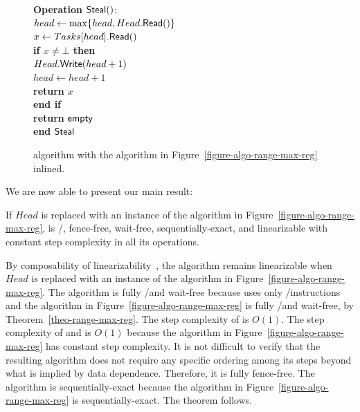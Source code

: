 \begin{figure}[H]
{{\begin{minipage}[t]{150mm}
\begin{tabbing}
          {\bf Operation} \({\sf \small Steal}()\): \\
           \> \> \(head \leftarrow \max\{head, Head.{\sf \small Read}()\}\)\\
           \> \> \(x \leftarrow Tasks[head].{\sf \small Read}()\) \\
           \> \> {\bf if \(x \neq \bot\) then}\\
           \> \> \> \(Head.{\sf \small Write}(head+1)\)\\
           \> \> \> \(head \leftarrow head+1\)\\
           \> \> \> {\bf return} \(x\)\\
           \> \> {\bf end if}\\
           \> \> {\bf return} ${\sf \small empty}$\\
          {\bf end} ${\sf \small Steal}$

        \end{tabbing}
      \end{minipage} }
    \caption{\label{figure-w-mult}\NCWSM algorithm with the \RangeMaxReg
      algorithm in Figure~\ref{figure-algo-range-max-reg} inlined.}
  }
\end{figure}

We are now able to present our main result:

\begin{theorem}\label{theo-wf-fully}
If \(Head\) is replaced with an instance of the algorithm in Figure~\ref{figure-algo-range-max-reg}, \NCWSM is \R/\W, fence-free, wait-free, sequentially-exact, and linearizable with constant step complexity in all its operations.
\end{theorem}

\begin{thesisproof}
By composability of linearizability~\cite{DBLP_journals_toplas_HerlihyW90}, the algorithm remains linearizable when \(Head\) is replaced with an instance of the algorithm in Figure~\ref{figure-algo-range-max-reg}. The algorithm is fully \R/\W and wait-free because \Put uses only \R/\W instructions and the \RangeMaxReg algorithm in Figure~\ref{figure-algo-range-max-reg} is fully \R/\W and wait-free, by Theorem~\ref{theo-range-max-reg}. The step complexity of \Put is $O(1)$. The step complexity of \Take and \Steal is $O(1)$ because the \RangeMaxReg algorithm in Figure~\ref{figure-algo-range-max-reg} has constant step complexity. It is not difficult to verify that the resulting algorithm does not require any specific ordering among its steps beyond what is implied by data dependence. Therefore, it is fully fence-free. The algorithm is sequentially-exact because the algorithm in Figure~\ref{figure-algo-range-max-reg} is sequentially-exact. The theorem follows.
\end{thesisproof}

